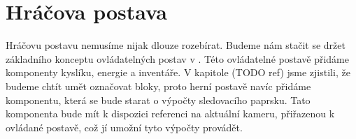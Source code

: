 
\section{Hráčova postava}
Hráčovu postavu nemusíme nijak dlouze rozebírat. Budeme nám stačit se držet základního konceptu ovládatelných postav v \UEu{}. Této ovládatelné postavě přidáme komponenty kyslíku, energie a inventáře. V kapitole (TODO ref) jsme zjistili, že budeme chtít umět označovat bloky, proto herní postavě navíc přidáme komponentu, která se bude starat o výpočty sledovacího paprsku. Tato komponenta bude mít k dispozici referenci na aktuální kameru, přiřazenou k ovládané postavě, což jí umožní tyto výpočty provádět.
